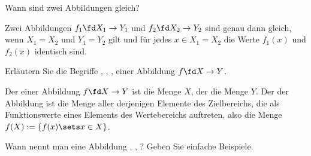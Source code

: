 \begin{frage}
  \label{03_abid}
  Wann sind zwei Abbildungen gleich?
\end{frage}

\begin{antwort}
  Zwei Abbildungen $f_1\fd X_1\to Y_1$ und $f_2\fd  X_2 \to Y_2$ sind 
  genau dann gleich, wenn $X_1=X_2$ und $Y_1=Y_2$ gilt und für jedes 
  $x\in X_1=X_2$ die Werte $f_1(x)$ und $f_2(x)$ identisch sind. 
  \AntEnd
\end{antwort}

\begin{frage}\label{03_meng}
  Erläutern Sie die Begriffe 
  , , , 
   einer Abbildung $f\fd X\to Y$.
\end{frage}

\begin{antwort}
  Der  einer Abbildung $f\fd X\to Y$ 
  ist die Menge $X$, der   
  die Menge $Y$. Der  der 
  Abbildung ist die Menge aller 
  derjenigen Elemente des Zielbereichs, die als Funktionswerte eines 
  Elements des Wertebereichs auftreten, also die Menge 
  $ f(X):=\{ f(x)\sets x\in X\}$. 
  \AntEnd
\end{antwort}

\begin{frage}\label{03_jek}
  Wann nennt man eine Abbildung 
  ,
  ,
  ? 
  Geben Sie einfache Beispiele. 
\end{frage}

